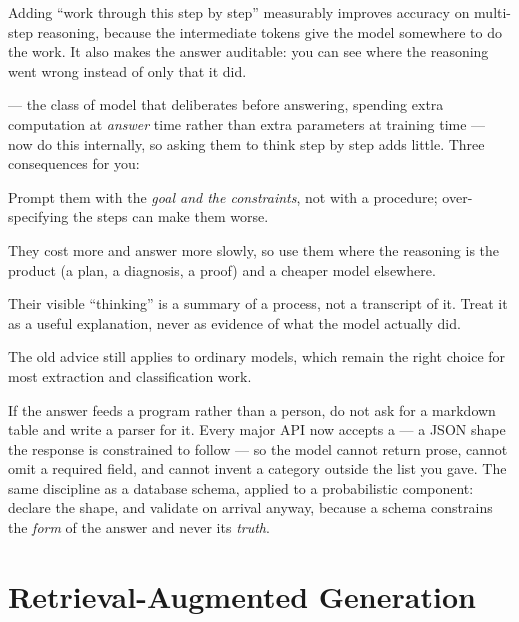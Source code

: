 \begin{conceptbox}
Adding ``work through this step by step'' measurably improves accuracy on
multi-step reasoning, because the intermediate tokens give the model somewhere to
do the work. It also makes the answer auditable: you can see where the reasoning
went wrong instead of only that it did.

 --- the class of model that deliberates before answering,
spending extra computation at \emph{answer} time rather than extra parameters at
training time --- now do this internally, so asking them to think step by step adds
little. Three consequences for you:
\begin{tight}
  \item Prompt them with the \emph{goal and the constraints}, not with a procedure;
        over-specifying the steps can make them worse.
  \item They cost more and answer more slowly, so use them where the reasoning is
        the product (a plan, a diagnosis, a proof) and a cheaper model elsewhere.
  \item Their visible ``thinking'' is a summary of a process, not a transcript of
        it. Treat it as a useful explanation, never as evidence of what the model
        actually did.
\end{tight}
The old advice still applies to ordinary models, which remain the right choice for
most extraction and classification work.
\end{conceptbox}

\begin{conceptbox}
If the answer feeds a program rather than a person, do not ask for a markdown table
and write a parser for it. Every major API now accepts a  --- a JSON
shape the response is constrained to follow --- so the model cannot return prose,
cannot omit a required field, and cannot invent a category outside the list you
gave. The same discipline as a database schema, applied to a probabilistic
component: declare the shape, and validate on arrival anyway, because a
schema constrains the \emph{form} of the answer and never its \emph{truth}.
\end{conceptbox}

\section{Retrieval-Augmented Generation}

